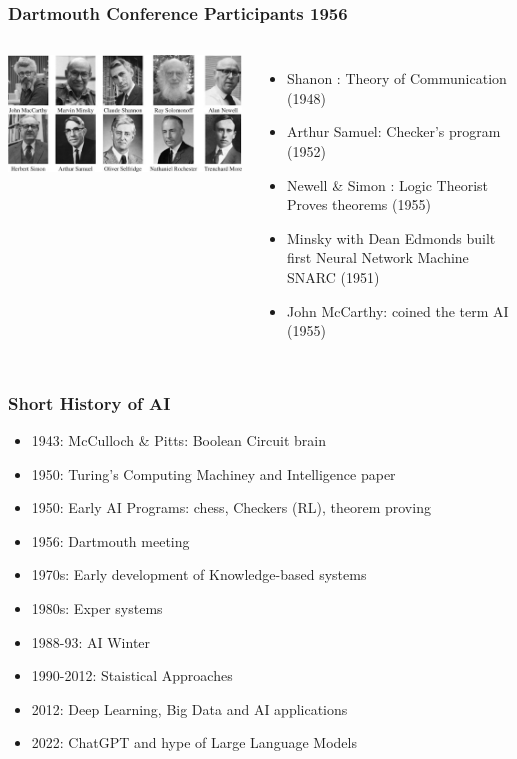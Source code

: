 \documentclass{beamer}
\begin{document}
\begin{frame}
  \frametitle{Dartmouth Conference Participants 1956}
  \begin{columns}
    \includegraphics[width=\textwidth]{DarthmouthParticipants.png}    

    \begin{itemize}
      \item Shanon : Theory of Communication (1948)
      \item Arthur Samuel: Checker's program (1952)
      \item Newell \& Simon : Logic Theorist Proves theorems (1955) 
      \item Minsky with Dean Edmonds built first Neural Network Machine SNARC (1951)
      \item John McCarthy: coined the term AI (1955)
    \end{itemize}
  \end{columns}

\end{frame}

\begin{frame}
  \frametitle{Short History of AI}
  \small
  \begin{itemize}
    \item 1943: McCulloch \& Pitts: Boolean Circuit brain
    \item 1950: Turing's Computing Machiney and Intelligence paper
    \item 1950: Early AI Programs: chess, Checkers (RL), theorem proving
    \item 1956: Dartmouth meeting
    \item 1970s: Early development of Knowledge-based systems
    \item 1980s: Exper systems
    \item 1988-93: AI Winter
    \item 1990-2012: Staistical Approaches
    \item 2012: Deep Learning, Big Data and AI applications
    \item 2022: ChatGPT and hype of Large Language Models
  \end{itemize}
\end{frame}
\end{document}
